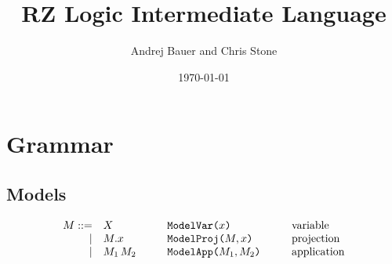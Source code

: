 \documentclass[12pt]{article}
\title{RZ Logic Intermediate Language}
\date{\today}
\author{Andrej Bauer and Chris Stone}
\newcommand{\M}{M}
\newcommand{\X}{X} %
\newcommand{\n}{x} %
\begin{document}
\maketitle
\section{Grammar}

\subsection{Models}
\[
\begin{array}{rl@{\hspace{1cm}}l@{\hspace{1cm}}l}
 \M ::= & \X & \texttt{ModelVar($\n$)} & \mbox{variable}\\
|&\M.\n&\texttt{ModelProj($\M,\n$)}&\mbox{projection}\\
|&\M_1\,\M_2&\texttt{ModelApp($\M_1,\M_2$)}&\mbox{application}\\
\end{array}
\]
\end{document}
